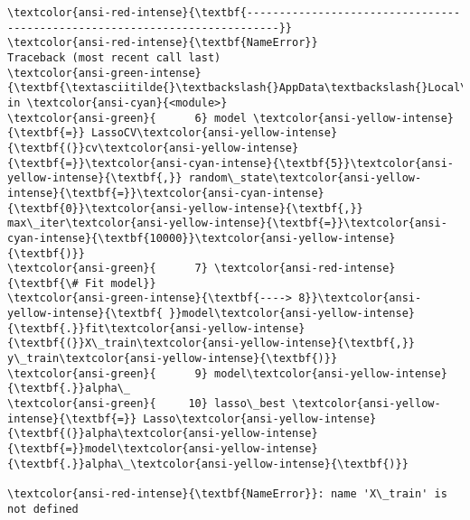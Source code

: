 \documentclass[11pt]{article}
\begin{document}
    \begin{Verbatim}[commandchars=\\\{\}, frame=single, framerule=2mm, rulecolor=\color{outerrorbackground}]
\textcolor{ansi-red-intense}{\textbf{---------------------------------------------------------------------------}}
\textcolor{ansi-red-intense}{\textbf{NameError}}                                 Traceback (most recent call last)
\textcolor{ansi-green-intense}{\textbf{\textasciitilde{}\textbackslash{}AppData\textbackslash{}Local\textbackslash{}Temp/ipykernel\_8232/960556233.py}} in \textcolor{ansi-cyan}{<module>}
\textcolor{ansi-green}{      6} model \textcolor{ansi-yellow-intense}{\textbf{=}} LassoCV\textcolor{ansi-yellow-intense}{\textbf{(}}cv\textcolor{ansi-yellow-intense}{\textbf{=}}\textcolor{ansi-cyan-intense}{\textbf{5}}\textcolor{ansi-yellow-intense}{\textbf{,}} random\_state\textcolor{ansi-yellow-intense}{\textbf{=}}\textcolor{ansi-cyan-intense}{\textbf{0}}\textcolor{ansi-yellow-intense}{\textbf{,}} max\_iter\textcolor{ansi-yellow-intense}{\textbf{=}}\textcolor{ansi-cyan-intense}{\textbf{10000}}\textcolor{ansi-yellow-intense}{\textbf{)}}
\textcolor{ansi-green}{      7} \textcolor{ansi-red-intense}{\textbf{\# Fit model}}
\textcolor{ansi-green-intense}{\textbf{----> 8}}\textcolor{ansi-yellow-intense}{\textbf{ }}model\textcolor{ansi-yellow-intense}{\textbf{.}}fit\textcolor{ansi-yellow-intense}{\textbf{(}}X\_train\textcolor{ansi-yellow-intense}{\textbf{,}} y\_train\textcolor{ansi-yellow-intense}{\textbf{)}}
\textcolor{ansi-green}{      9} model\textcolor{ansi-yellow-intense}{\textbf{.}}alpha\_
\textcolor{ansi-green}{     10} lasso\_best \textcolor{ansi-yellow-intense}{\textbf{=}} Lasso\textcolor{ansi-yellow-intense}{\textbf{(}}alpha\textcolor{ansi-yellow-intense}{\textbf{=}}model\textcolor{ansi-yellow-intense}{\textbf{.}}alpha\_\textcolor{ansi-yellow-intense}{\textbf{)}}

\textcolor{ansi-red-intense}{\textbf{NameError}}: name 'X\_train' is not defined
    \end{Verbatim}
\end{document}
